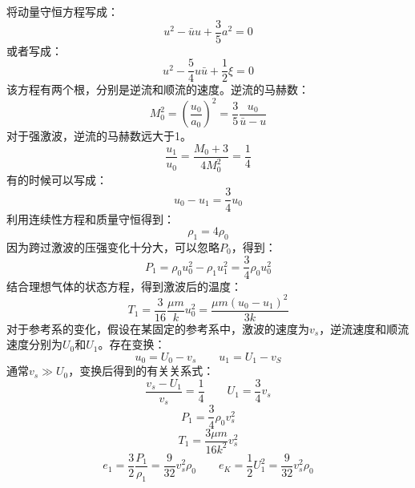 将动量守恒方程写成：
\begin{equation}
	u^2-\bar{u}u+\frac{3}{5}a^2=0
\end{equation}
或者写成：
\begin{equation}
	u^2-\frac{5}{4}u\bar{u}+\frac{1}{2}\xi=0
\end{equation}
该方程有两个根，分别是逆流和顺流的速度。逆流的马赫数：
\begin{equation}
	M_{0}^2=\left(\frac{u_{0}}{a_{0}}\right)^2=\frac{3}{5}\frac{u_{0}}{\bar{u}-u}
\end{equation}
对于强激波，逆流的马赫数远大于1。
\begin{equation}
	\frac{u_{1}}{u_{0}}=\frac{M_{0}+3}{4M_{0}^2}=\frac{1}{4}
\end{equation}
有的时候可以写成：
\begin{equation}
	u_{0}-u_{1}=\frac{3}{4}u_{0}
\end{equation}
利用连续性方程和质量守恒得到：
\begin{equation}
	\rho_{1}=4\rho_{0}
\end{equation}
因为跨过激波的压强变化十分大，可以忽略$P_{0}$，得到：
\begin{equation}
	P_{1}=\rho_{0}u_{0}^2-\rho_{1}u_{1}^2=\frac{3}{4}\rho_{0}u_{0}^2
\end{equation}
结合理想气体的状态方程，得到激波后的温度：
\begin{equation}
	T_{1}=\frac{3}{16}\frac{\mu m}{k}u_{0}^2=\frac{\mu m\left(u_{0}-u_{1}\right)^2}{3k}
\end{equation}
对于参考系的变化，假设在某固定的参考系中，激波的速度为$v_{s}$，逆流速度和顺流速度分别为$U_{0}$和$U_{1}$。存在变换：
\begin{equation}
	u_{0}=U_{0}-v_{s}\qquad u_{1}=U_{1}-v_{S}
\end{equation}
通常$v_{s} \gg U_{0}$，变换后得到的有关关系式：
\begin{equation}
	\frac{v_{s}-U_{1}}{v_{s}}=\frac{1}{4}\qquad U_{1}=\frac{3}{4}v_{s}
\end{equation}
\begin{equation}
	P_{1}=\frac{3}{4}\rho_{0}v_{s}^2
\end{equation}
\begin{equation}
	T_{1}=\frac{3\mu m}{16k^2}v_{s}^2
\end{equation}
\begin{equation}
	e_{1}=\frac{3}{2}\frac{P_{1}}{\rho_{1}}=\frac{9}{32}v_{s}^2\rho_{0}\qquad e_{K}=\frac{1}{2}U_{1}^2=\frac{9}{32}v_{s}^2\rho_{0}
\end{equation}
